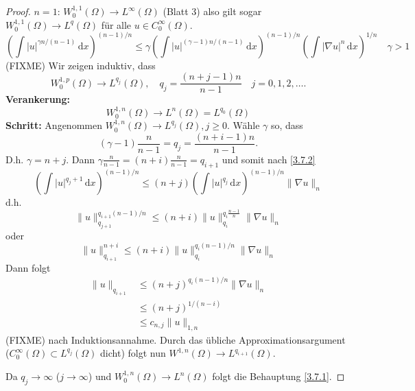 \documentclass[
paper=a4,
bibtotocnumbered,
liststotocnumbered,
tablecaptionabove,
pointlessnumbers,
twoside,
openright,
10pt
]
{report}
\theoremstyle{definition}
\numberwithin{equation}{chapter}
\begin{document}
\begin{proof}
$n=1$: $W_0^{1,1}(\Omega) \to L^\infty(\Omega)$ (Blatt 3) also gilt sogar $W_0^{1,1}(\Omega) \to L^q(\Omega)$ 
für alle $u\in C_0^\infty(\Omega)$.
\begin{equation}\label{3.7.2}
 \left ( \int |u|^{\gamma n/(n-1)} \, \mathrm dx \right )^{(n-1)/n} \le \gamma \left ( \int |u|^{(\gamma-1)n/(n-1)}\, \mathrm dx\right )^{(n-1)/n} (\int |\nabla u|^n \, \mathrm dx)^{1/n} \quad \gamma>1
\end{equation}
(FIXME)
Wir zeigen induktiv, dass
\begin{equation}
 W_0^{1,p}(\Omega) \to L^{q_j}(\Omega), \quad q_j = \frac{(n+j-1)n}{n-1}\quad j=0,1,2,\ldots.
\end{equation}
\textbf{Verankerung:} 
\begin{equation}
 W_0^{1,n}(\Omega) \to L^n(\Omega) = L^{q_0}(\Omega)
\end{equation}
\textbf{Schritt:} Angenommen $W_0^{1,n}(\Omega) \to L^{q_j}(\Omega), j\ge 0$. Wähle $\gamma$ so, dass 
\begin{equation}
 (\gamma-1) \frac{n}{n-1} = q_j = \frac{(n+i-1)n}{n-1}. 
\end{equation}
D.h. $\gamma=n+j$. Dann $\gamma \frac{n}{n-1} = (n+i) \frac{n}{n-1} = q_{i+1}$ und somit nach  \eqref{3.7.2}
\begin{equation}
 \left (\int |u|^{q_j+1} \, \mathrm dx\right )^{(n-1)/n} \le (n+j) \left ( \int |u|^{q_j}\, \mathrm dx\right )^{(n-1)/n} \| \nabla u\|_n
\end{equation}
d.h.
\begin{equation}
 \|u\|_{q_{j+1}}^{q_{i+1} (n-1)/n} \le ( n+i) \| u\|_{q_i}^{q_i \frac{n-1}{n}} \| \nabla u\|_n 
\end{equation}
oder
\begin{equation}
 \| u\|^{n+i}_{q_{i+1}} \le (n+i) \| u\|_{q_i}^{q_i (n-1)/n}\| \nabla u\|_n
\end{equation}
Dann folgt
\begin{align*}
 \|u\|_{q_{i+1}} &\le (n+j)^{q_i (n-1)/n}\| \nabla u\|_n\\
 &\le (n+j)^{1/(n-i)}\\ %
 &\le c_{n,j} \| u \|_{1,n}
\end{align*}(FIXME)
nach Induktionsannahme. Durch das übliche Approximationsargument ($C_0^\infty(\Omega) \subset L^{q_j}(\Omega)$ dicht) folgt nun $W^{1,n}(\Omega) \to L^{q_{i+1}}(\Omega)$.

Da $q_j \to \infty$ ($j\to \infty$) und $W_0^{1,n}(\Omega) \to L^n(\Omega)$ folgt die Behauptung \eqref{3.7.1}.
\end{proof}
\end{document}
